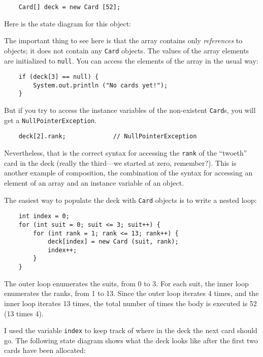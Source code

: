 \documentclass{book}
\newcommand{\beforefig}{\vspace{1.3\parskip}}
\newcommand{\afterfig}{\vspace{-0.2\parskip}}
\newcommand{\myfig}[1]{
    \beforefig
    \centerline{\epsfig{#1,scale=0.8}}
    \afterfig
}
\begin{document}
\begin{verbatim}
    Card[] deck = new Card [52];
\end{verbatim}

Here is the state diagram for this object:


\myfig{figure=figs/cardarray.eps}

The important thing to see here is that the array contains
only {\em references} to objects; it does not contain any
{\tt Card} objects.  The values of the array elements are
initialized to {\tt null}.  You can access the elements of
the array in the usual way:

\begin{verbatim}
    if (deck[3] == null) {
        System.out.println ("No cards yet!");
    }
\end{verbatim}
%
But if you try to access the instance variables of the
non-existent {\tt Card}s, you will get a {\tt NullPointerException}.


\begin{verbatim}
    deck[2].rank;             // NullPointerException
\end{verbatim}
%
Nevertheless, that is the correct syntax for accessing the {\tt rank}
of the ``twoeth'' card in the deck (really the third---we started
at zero, remember?).  This is another example of composition, the
combination of the syntax for accessing an element of an array
and an instance variable of an object.


The easiest way to populate the deck with {\tt Card} objects
is to write a nested loop:

\begin{verbatim}
    int index = 0;
    for (int suit = 0; suit <= 3; suit++) {
        for (int rank = 1; rank <= 13; rank++) {
            deck[index] = new Card (suit, rank);
            index++;
        }
    }
\end{verbatim}
%
The outer loop enumerates the suits, from 0 to 3.  For
each suit, the inner loop enumerates the ranks, from 1
to 13.  Since the outer loop iterates 4 times, and
the inner loop iterates 13 times, the total number of times
the body is executed is 52 (13 times 4).


I used the variable {\tt index} to keep track of where in the
deck the next card should go.  The following state diagram
shows what the deck looks like after the first two cards
have been allocated:
\end{document}
